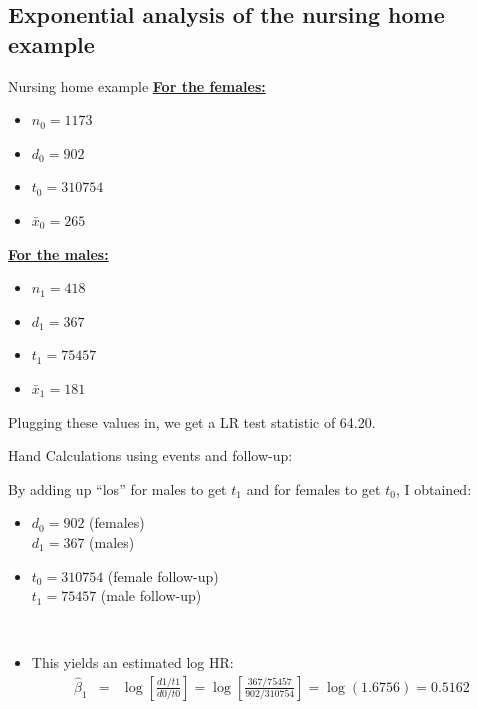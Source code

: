 \documentclass[envcountsect, 10pt, portrait, palatino]{beamer}
\begin{document}
\subsection{Exponential analysis of the nursing home example}
\begin{frame}{Nursing home example}
\underline{\bf For the females:}
\begin{itemize}
\item $n_0 = 1173$
\item $d_0 = 902$
\item $t_0 = 310754$
\item $\bar{x}_0 = 265 $
\end{itemize}

\underline{\bf For the males:}
\begin{itemize}
\item $n_1 = 418$
\item $d_1 = 367$
\item $t_1 = 75457$
\item $\bar{x}_1 = 181 $
\end{itemize}

Plugging these values in, we get a LR test statistic of 64.20.
\end{frame} 
\begin{frame}{Hand Calculations using events and follow-up:}

By adding up ``{\sc los}'' for males to get $t_1$ and for
females to get $t_0$, I obtained:
\begin{itemize}
\item $d_0 = 902$ (females)\\
      $d_1 = 367$ (males)

\vspace{0.1in}
\item $t_0 = 310754$ (female follow-up)\\
      $t_1 = 75457$ (male follow-up)

\vspace{0.2in}
\
\item This yields an estimated log HR:
\begin{eqnarray*}
\hat\beta_1 & = & \log \left[ \frac{d1/t1}{d0/t0} \right]
= \log \left[ \frac{367/75457}{902/310754} \right]
= \log (1.6756) = 0.5162
\end{eqnarray*}
\end{itemize}
\end{frame}
\end{document}
